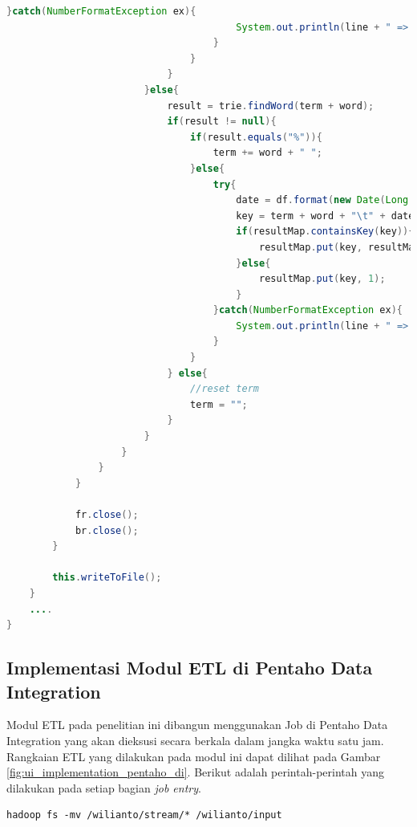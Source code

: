 \begin{lstlisting}[language=Java,basicstyle=\tiny,caption=Counter.java (Tanpa MapReduce),label={lst:kode_tanpa_mapreduce}]
                                    }catch(NumberFormatException ex){
                                        System.out.println(line + " => " + ex.toString());
                                    }
                                }
                            }
                        }else{
                            result = trie.findWord(term + word);
                            if(result != null){
                                if(result.equals("%")){
                                    term += word + " ";
                                }else{
                                    try{
                                        date = df.format(new Date(Long.parseLong(parse[parse.length - 1])));
                                        key = term + word + "\t" + date;
                                        if(resultMap.containsKey(key)){
                                            resultMap.put(key, resultMap.get(key) + 1);
                                        }else{
                                            resultMap.put(key, 1);
                                        }
                                    }catch(NumberFormatException ex){
                                        System.out.println(line + " => " + ex.toString());
                                    }
                                }
                            } else{
                            	//reset term
                            	term = "";
                        	}
                        }
                    }
                }
            }
            
            fr.close();
            br.close();
        }
        
        this.writeToFile();
    }
    ....
}
\end{lstlisting}

\subsection{Implementasi Modul ETL di Pentaho Data Integration}
Modul ETL pada penelitian ini dibangun menggunakan Job di Pentaho Data Integration yang akan dieksusi secara berkala dalam jangka waktu satu jam. Rangkaian ETL yang dilakukan pada modul ini dapat dilihat pada Gambar \ref{fig:ui_implementation_pentaho_di}. Berikut adalah perintah-perintah yang dilakukan pada setiap bagian \textit{job entry}.

\begin{lstlisting}[basicstyle=\tiny,caption=Memindahkan data dari folder \textit{streaming}]
hadoop fs -mv /wilianto/stream/* /wilianto/input
\end{lstlisting}

